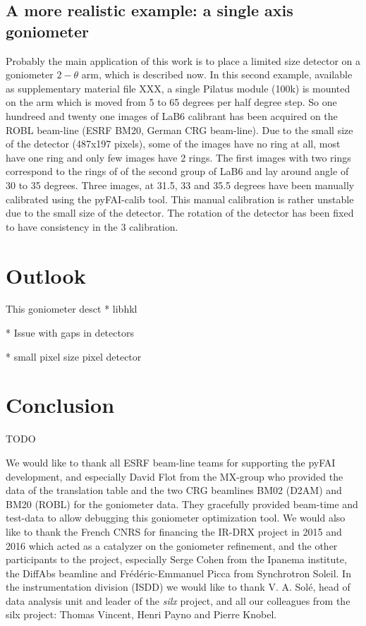 \documentclass[preprint]{iucr}              %
\begin{document}
\subsection{A more realistic example: a single axis goniometer}

Probably the main application of this work is to place a limited size detector
on a goniometer $2-\theta$ arm, which is described now.
In this second example, available as supplementary material file XXX, a single
Pilatus module (100k) is mounted on the arm which is moved from 5 to 65 degrees per half
degree step. 
So one hundreed and twenty one images of LaB6 calibrant has been acquired on the
ROBL beam-line (ESRF BM20, German CRG beam-line).
Due to the small size of the detector (487x197 pixels),
some of the images have no ring at all, most have one ring and only few images
have 2 rings.
The first images with two rings correspond to the rings of of the second group
of LaB6 and lay around angle of 30 to 35 degrees.
Three images, at 31.5, 33 and 35.5 degrees have been manually calibrated using
the pyFAI-calib tool.
This manual calibration is rather unstable due to the small size of the
detector. 
The rotation of the detector has been fixed to have consistency in the 3
calibration.


\section{Outlook}

This goniometer desct
* libhkl

* Issue with gaps in detectors

* small pixel size pixel detector

\section{Conclusion}

TODO



 

We would like to thank all ESRF beam-line teams for supporting the
pyFAI development, and especially David Flot from the MX-group who provided the
data of the translation table and the two CRG beamlines BM02 (D2AM) and BM20
(ROBL) for the goniometer data. 
They gracefully provided beam-time and test-data to allow debugging this 
goniometer optimization tool.
We would also like to thank the French CNRS for financing the IR-DRX project
in 2015 and 2016 which acted as a catalyzer on the goniometer refinement,
and the other participants to the project, especially Serge Cohen from the
Ipanema institute, the DiffAbs beamline and Frédéric-Emmanuel Picca from
Synchrotron Soleil.
In the instrumentation division (ISDD) we would like to thank V. A. Solé,  head
of data analysis unit and leader of the \textit{silx} project, and all our
colleagues from the silx project: Thomas Vincent, Henri Payno and Pierre Knobel.
\end{document}
